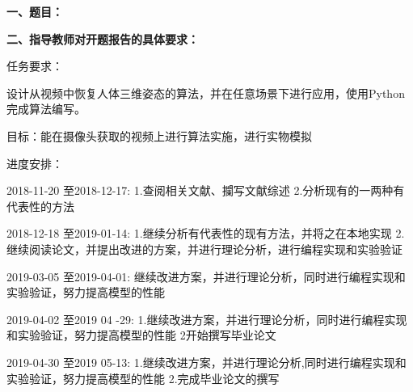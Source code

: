 {
    \setlength{\parindent}{0em}
    \par {\bfseries 一、题目：\uline{\hfill \Title \hfill}}
    \par {\bfseries 二、指导教师对开题报告的具体要求：}
}


任务要求：

设计从视频中恢复人体三维姿态的算法，并在任意场景下进行应用，使用Python完成算法编写。

目标：能在摄像头获取的视频上进行算法实施，进行实物模拟
 
进度安排：

2018-11-20 至2018-12-17: 1.查阅相关文献、攔写文献综述  2.分析现有的一两种有代表性的方法
      
2018-12-18 至2019-01-14: 1.继续分析有代表性的现有方法，并将之在本地实现  2.继续阅读论文，并提出改进的方案，并进行理论分析，进行编程实现和实验验证

2019-03-05 至2019-04-01: 继续改进方案，并进行理论分析，同时进行编程实现和实验验证，努力提高模型的性能

2019-04-02 至2019 04 -29: 1.继续改进方案，并进行理论分析，同时进行编程实现和实验验证，努力提高模型的性能  2开始撰写毕业论文

2019-04-30 至2019 05-13: 1.继续改进方案，并进行理论分析,同时进行编程实现和实验验证，努力提高模型的性能  2.完成毕业论文的撰写


\mbox{} \vfill


